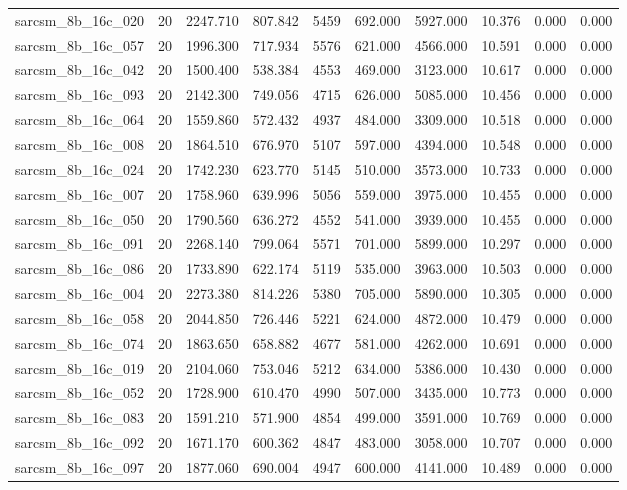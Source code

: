 \begin{tabular}{lrrrrrrrrr}
sarcsm\_8b\_16c\_020 & 20 & 2247.710 & 807.842 & 5459 & 692.000 & 5927.000 & 10.376 & 0.000 & 0.000 \\
sarcsm\_8b\_16c\_057 & 20 & 1996.300 & 717.934 & 5576 & 621.000 & 4566.000 & 10.591 & 0.000 & 0.000 \\
sarcsm\_8b\_16c\_042 & 20 & 1500.400 & 538.384 & 4553 & 469.000 & 3123.000 & 10.617 & 0.000 & 0.000 \\
sarcsm\_8b\_16c\_093 & 20 & 2142.300 & 749.056 & 4715 & 626.000 & 5085.000 & 10.456 & 0.000 & 0.000 \\
sarcsm\_8b\_16c\_064 & 20 & 1559.860 & 572.432 & 4937 & 484.000 & 3309.000 & 10.518 & 0.000 & 0.000 \\
sarcsm\_8b\_16c\_008 & 20 & 1864.510 & 676.970 & 5107 & 597.000 & 4394.000 & 10.548 & 0.000 & 0.000 \\
sarcsm\_8b\_16c\_024 & 20 & 1742.230 & 623.770 & 5145 & 510.000 & 3573.000 & 10.733 & 0.000 & 0.000 \\
sarcsm\_8b\_16c\_007 & 20 & 1758.960 & 639.996 & 5056 & 559.000 & 3975.000 & 10.455 & 0.000 & 0.000 \\
sarcsm\_8b\_16c\_050 & 20 & 1790.560 & 636.272 & 4552 & 541.000 & 3939.000 & 10.455 & 0.000 & 0.000 \\
sarcsm\_8b\_16c\_091 & 20 & 2268.140 & 799.064 & 5571 & 701.000 & 5899.000 & 10.297 & 0.000 & 0.000 \\
sarcsm\_8b\_16c\_086 & 20 & 1733.890 & 622.174 & 5119 & 535.000 & 3963.000 & 10.503 & 0.000 & 0.000 \\
sarcsm\_8b\_16c\_004 & 20 & 2273.380 & 814.226 & 5380 & 705.000 & 5890.000 & 10.305 & 0.000 & 0.000 \\
sarcsm\_8b\_16c\_058 & 20 & 2044.850 & 726.446 & 5221 & 624.000 & 4872.000 & 10.479 & 0.000 & 0.000 \\
sarcsm\_8b\_16c\_074 & 20 & 1863.650 & 658.882 & 4677 & 581.000 & 4262.000 & 10.691 & 0.000 & 0.000 \\
sarcsm\_8b\_16c\_019 & 20 & 2104.060 & 753.046 & 5212 & 634.000 & 5386.000 & 10.430 & 0.000 & 0.000 \\
sarcsm\_8b\_16c\_052 & 20 & 1728.900 & 610.470 & 4990 & 507.000 & 3435.000 & 10.773 & 0.000 & 0.000 \\
sarcsm\_8b\_16c\_083 & 20 & 1591.210 & 571.900 & 4854 & 499.000 & 3591.000 & 10.769 & 0.000 & 0.000 \\
sarcsm\_8b\_16c\_092 & 20 & 1671.170 & 600.362 & 4847 & 483.000 & 3058.000 & 10.707 & 0.000 & 0.000 \\
sarcsm\_8b\_16c\_097 & 20 & 1877.060 & 690.004 & 4947 & 600.000 & 4141.000 & 10.489 & 0.000 & 0.000 \\

\end{tabular}
